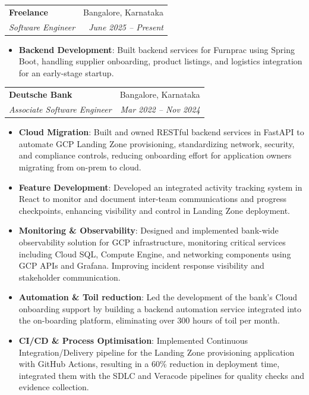 \documentclass[letterpaper,11pt]{article}
\makeatletter
\newcommand{\resumeItem}[2]{%
  \item\small{\textbf{#1}{: #2}}\par\vspace{-3pt}%
}
\newcommand{\resumeSubheading}[4]{
  \vspace{-1pt}\item
    \begin{tabular*}{0.97\textwidth}[t]{l@{\extracolsep{\fill}}r}
      \textbf{#1} & #2 \\
      \textit{\small#3} & \textit{\small #4} \\
    \end{tabular*}\vspace{-5pt}
}
\newcommand{\resumeItemListStart}{\begin{itemize}}
\newcommand{\resumeItemListEnd}{\end{itemize}\vspace{-5pt}}
\makeatother
\begin{document}
    \resumeSubheading
      {Freelance}{Bangalore, Karnataka}
      {Software Engineer}{June 2025 -- Present}
      \resumeItemListStart
        \resumeItem{Backend Development}
          {Built backend services for Furnprac using Spring Boot, handling supplier onboarding, product listings, and logistics integration for an early-stage startup.}
      \resumeItemListEnd
    \resumeSubheading
      {Deutsche Bank}{Bangalore, Karnataka}
      {Associate Software Engineer}{Mar 2022 -- Nov 2024}
      \resumeItemListStart
        \resumeItem{Cloud Migration}
          {Built and owned RESTful backend services in FastAPI to automate GCP Landing Zone provisioning, standardizing network, security, and compliance controls, reducing onboarding effort for application owners migrating from on-prem to cloud.}
        \resumeItem{Feature Development}
          {Developed an integrated activity tracking system in React to monitor and document inter-team communications and progress checkpoints, enhancing visibility and control in Landing Zone deployment.}
        \resumeItem{Monitoring \& Observability}
          {Designed and implemented bank-wide observability solution for GCP infrastructure, monitoring critical services including Cloud SQL, Compute Engine, and networking components using GCP APIs and Grafana. Improving incident response visibility and stakeholder communication.}
        \resumeItem{Automation \& Toil reduction}
          {Led the development of the bank's Cloud onboarding support by building a backend automation service integrated into the on-boarding platform, eliminating over 300 hours of toil per month.}
        \resumeItem{CI/CD \& Process Optimisation}
          {Implemented Continuous Integration/Delivery pipeline for the Landing Zone provisioning application with GitHub Actions, resulting in a 60\% reduction in deployment time, integrated them with the SDLC and Veracode pipelines for quality checks and evidence collection.}
      \resumeItemListEnd
       
\end{document}
